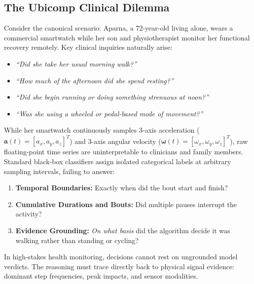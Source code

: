 \documentclass[11pt,a4paper]{article}
\begin{document}
\subsection{The Ubicomp Clinical Dilemma}
Consider the canonical scenario: Aparna, a 72-year-old living alone, wears a commercial smartwatch while her son and physiotherapist monitor her functional recovery remotely. Key clinical inquiries naturally arise:
\begin{itemize}
    \item \textit{``Did she take her usual morning walk?''}
    \item \textit{``How much of the afternoon did she spend resting?''}
    \item \textit{``Did she begin running or doing something strenuous at noon?''}
    \item \textit{``Was she using a wheeled or pedal-based mode of movement?''}
\end{itemize}

While her smartwatch continuously samples 3-axis acceleration ($\mathbf{a}(t) = [a_x, a_y, a_z]^T$) and 3-axis angular velocity ($\boldsymbol{\omega}(t) = [\omega_x, \omega_y, \omega_z]^T$), raw floating-point time series are uninterpretable to clinicians and family members. Standard black-box classifiers assign isolated categorical labels at arbitrary sampling intervals, failing to answer:
\begin{enumerate}
    \item \textbf{Temporal Boundaries:} Exactly when did the bout start and finish?
    \item \textbf{Cumulative Durations and Bouts:} Did multiple pauses interrupt the activity?
    \item \textbf{Evidence Grounding:} \textit{On what basis} did the algorithm decide it was walking rather than standing or cycling?
\end{enumerate}

In high-stakes health monitoring, decisions cannot rest on ungrounded model verdicts. The reasoning must trace directly back to physical signal evidence: dominant step frequencies, peak impacts, and sensor modalities.
\end{document}
